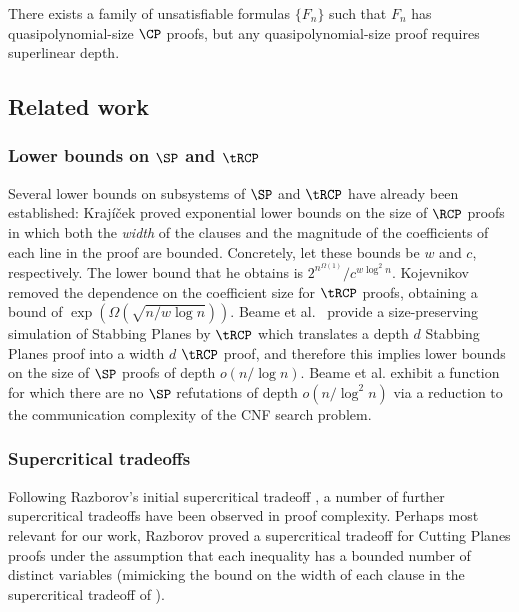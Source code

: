 \begin{conjecture}\label{conj:deepProofs}
	There exists a family of unsatisfiable formulas $\{F_n\}$ such that $F_n$ has quasipolynomial-size $\CP$ proofs, but any quasipolynomial-size proof requires superlinear depth.
\end{conjecture}





\subsection{Related work}
%

\subsubsection{Lower bounds on $\SP$ and $\tRCP$} Several lower bounds on subsystems of $\SP$ and $\tRCP$ have already been established: %
Kraj\'{i}\v{c}ek \cite{Krajicek98} proved exponential lower bounds on the size of $\RCP$ proofs in which both the \emph{width} of the clauses and the magnitude of the coefficients of each line in the proof are bounded. Concretely, let these bounds be
$w$ and $c$, respectively. 
The lower bound that he obtains is $2^{n^{\Omega(1)}}/c^{w \log^2 n}$. Kojevnikov \cite{Kojevnikov07} removed the dependence on the coefficient size for $\tRCP$ proofs, obtaining a bound of $\exp(\Omega(\sqrt{n/w \log n}))$. Beame et al.~\cite{BeameFIKPPR18} provide a size-preserving simulation of Stabbing Planes by $\tRCP$ which translates a depth $d$ Stabbing Planes proof into a width $d$ $\tRCP$ proof, %
and therefore this implies lower bounds on the size of $\SP$ proofs of depth $o(n/\log n)$. Beame et al. \cite{BeameFIKPPR18} exhibit a function for which there are no $\SP$ refutations of depth $o(n / \log^2 n)$ via a reduction to the communication complexity of the CNF search problem. %

\subsubsection{Supercritical tradeoffs} %
%
%
%
Following Razborov's initial supercritical tradeoff \cite{Razborov16},  %
a number of
further  %
supercritical tradeoffs have been observed in proof complexity.  
Perhaps most relevant for our work, Razborov \cite{Razborov17} proved a supercritical tradeoff for Cutting Planes proofs under the assumption that each inequality has a bounded number of distinct variables (mimicking the bound on the width of each clause in the supercritical tradeoff of \cite{Razborov16}). 

